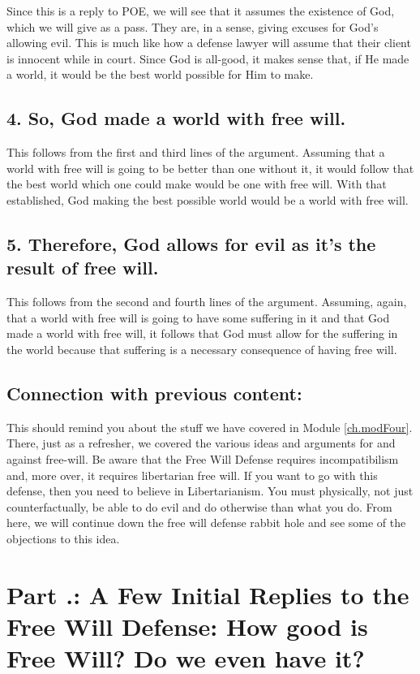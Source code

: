 Since this is a reply to POE, we will see that it assumes the existence of God, which we will give as a pass. They are, in a sense, giving excuses for God's allowing evil. This is much like how a defense lawyer will assume that their client is innocent while in court. Since God is all-good, it makes sense that, if He made a world, it would be the best world possible for Him to make. 

\subsection{4. So, God made a world with free will.}

This follows from the first and third lines of the argument. Assuming that a world with free will is going to be better than one without it, it would follow that the best world which one could make would be one with free will. With that established, God making the best possible world would be a world with free will.

\subsection{5. Therefore, God allows for evil as it's the result of free will.}

This follows from the second and fourth lines of the argument. Assuming, again, that a world with free will is going to have some suffering in it and that God made a world with free will, it follows that God must allow for the suffering in the world because that suffering is a necessary consequence of having free will. 

\subsection{Connection with previous content:}

This should remind you about the stuff we have covered in Module \ref{ch.modFour}. There, just as a refresher, we covered the various ideas and arguments for and against free-will. Be aware that the Free Will Defense requires incompatibilism and, more over, it requires libertarian free will. If you want to go with this defense, then you need to believe in Libertarianism. You must physically, not just counterfactually, be able to do evil and do otherwise than what you do.  From here, we will continue down the free will defense rabbit hole and see some of the objections to this idea.

\section{Part \thechapcount.\theseccount: A Few Initial Replies to the Free Will Defense: How good is Free Will? Do we even have it?}

